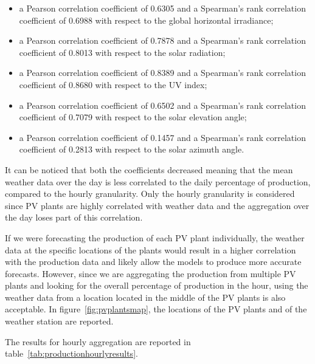 \begin{itemize}
  \item a Pearson correlation coefficient of 0.6305 and a Spearman's rank correlation coefficient of 0.6988 with respect to the global horizontal irradiance;
  \item a Pearson correlation coefficient of 0.7878 and a Spearman's rank correlation coefficient of 0.8013 with respect to the solar radiation;
  \item a Pearson correlation coefficient of 0.8389 and a Spearman's rank correlation coefficient of 0.8680 with respect to the UV index;
  \item a Pearson correlation coefficient of 0.6502 and a Spearman's rank correlation coefficient of 0.7079 with respect to the solar elevation angle;
  \item a Pearson correlation coefficient of 0.1457 and a Spearman's rank correlation coefficient of 0.2813 with respect to the solar azimuth angle.
\end{itemize}
It can be noticed that both the coefficients decreased meaning that the mean weather data over the day is less correlated to the daily percentage of production, compared to the hourly granularity.
Only the hourly granularity is considered since PV plants are highly correlated with weather data and the aggregation over the day loses part of this correlation.

If we were forecasting the production of each PV plant individually, the weather data at the specific locations of the plants would result in a higher correlation with the production data and likely allow the models to produce more accurate forecasts.
However, since we are aggregating the production from multiple PV plants and looking for the overall percentage of production in the hour, using the weather data from a location located in the middle of the PV plants is also acceptable.
In figure~\ref{fig:pvplantsmap}, the locations of the PV plants and of the weather station are reported.



The results for hourly aggregation are reported in table~\ref{tab:productionhourlyresults}.  %

